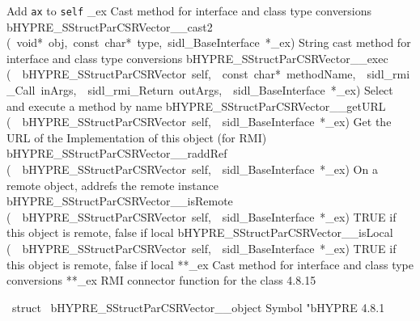 \documentclass{article}
\begin{document}
\begin{cxxentry}
\begin{cxxentry}
\begin{cxxnames}
        {
Add {\tt a}{\tt x} to {\tt self}}
        {}
\label{cxx.4.8.28}
        {\_ex}
        {}
        {
Cast method for interface and class type conversions}
        {}
\label{cxx.4.8.29}
        {bHYPRE\_SStructParCSRVector\_\_cast2}
        {(\ void*\ obj,\ const\ char*\ type,\ sidl\_BaseInterface\ *\_ex)}
        {
String cast method for interface and class type conversions}
        {}
\label{cxx.4.8.30}
        {bHYPRE\_SStructParCSRVector\_\_exec}
        {(\ \ bHYPRE\_SStructParCSRVector\ self,\ \ const\ char*\ methodName,\ \ sidl\_rmi\_Call\ inArgs,\ \ sidl\_rmi\_Return\ outArgs,\ \ sidl\_BaseInterface\ *\_ex)}
        {
Select and execute a method by name}
        {}
\label{cxx.4.8.31}
        {bHYPRE\_SStructParCSRVector\_\_getURL}
        {(\ \ bHYPRE\_SStructParCSRVector\ self,\ \ sidl\_BaseInterface\ *\_ex)}
        {
Get the URL of the Implementation of this object (for RMI)}
        {}
\label{cxx.4.8.32}
        {bHYPRE\_SStructParCSRVector\_\_raddRef}
        {(\ \ bHYPRE\_SStructParCSRVector\ self,\ \ sidl\_BaseInterface\ *\_ex)}
        {
On a remote object, addrefs the remote instance}
        {}
\label{cxx.4.8.33}
        {bHYPRE\_SStructParCSRVector\_\_isRemote}
        {(\ \ bHYPRE\_SStructParCSRVector\ self,\ \ sidl\_BaseInterface\ *\_ex)}
        {
TRUE if this object is remote, false if local}
        {}
\label{cxx.4.8.34}
        {bHYPRE\_SStructParCSRVector\_\_isLocal}
        {(\ \ bHYPRE\_SStructParCSRVector\ self,\ \ sidl\_BaseInterface\ *\_ex)}
        {
TRUE if this object is remote, false if local}
        {}
\label{cxx.4.8.35}
        {**\_ex}
        {}
        {
Cast method for interface and class type conversions}
        {}
\label{cxx.4.8.36}
        {**\_ex}
        {}
        {
RMI connector function for the class}
        {4.8.15}
\end{cxxnames}
\begin{cxxvariable}
{\ struct\ }
        {bHYPRE\_SStructParCSRVector\_\_object}
        {}
        {
Symbol "bHYPRE}
        {4.8.1}
\begin{cxxdoc}


\end{cxxdoc}
\end{cxxvariable}
\end{cxxentry}
\end{cxxentry}
\end{document}
